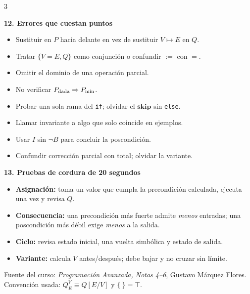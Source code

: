 \documentclass[10pt,letterpaper]{article}
\newcommand{\topic}[1]{%
  \vspace{1.0pt}\colorbox{azulclaro}{%
    \parbox{\dimexpr\linewidth-2\fboxsep\relax}{\color{azul}\bfseries #1}}\vspace{0.5pt}}
\begin{document}
\begin{multicols*}{3}
\topic{12. Errores que cuestan puntos}

\begin{itemize}
  \item Sustituir en $P$ hacia delante en vez de sustituir $V\mapsto E$ en $Q$.
  \item Tratar $\{V=E,Q\}$ como conjunción o confundir $:=$ con $=$.
  \item Omitir el dominio de una operación parcial.
  \item No verificar $P_{\rm dada}\Rightarrow P_{\min}$.
  \item Probar una sola rama del \texttt{if}; olvidar el $\mathbf{skip}$ sin \texttt{else}.
  \item Llamar invariante a algo que solo coincide en ejemplos.
  \item Usar $I$ sin $\neg B$ para concluir la poscondición.
  \item Confundir corrección parcial con total; olvidar la variante.
\end{itemize}

\topic{13. Pruebas de cordura de 20 segundos}

\begin{itemize}
  \item \textbf{Asignación:} toma un valor que cumpla la precondición calculada,
        ejecuta una vez y revisa $Q$.
  \item \textbf{Consecuencia:} una precondición más fuerte admite \emph{menos}
        entradas; una poscondición más débil exige \emph{menos} a la salida.
  \item \textbf{Ciclo:} revisa estado inicial, una vuelta simbólica y estado de salida.
  \item \textbf{Variante:} calcula $V$ antes/después; debe bajar y no cruzar sin límite.
\end{itemize}

\vfill
{\scriptsize\color{gris}
Fuente del curso: \emph{Programación Avanzada, Notas 4--6}, Gustavo Márquez
Flores. Convención usada: $Q_E^V\equiv Q[E/V]$ y $\{\ \}=\top$.
}

\end{multicols*}
\end{document}
